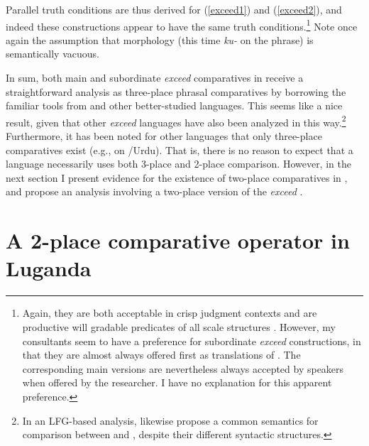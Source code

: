 \documentclass[output=paper,
modfonts
]{langscibook}
\begin{document}
Parallel truth conditions are thus derived for (\ref{exceed1}) and (\ref{exceed2}), and indeed these constructions appear to have the same truth conditions.\footnote{Again, they are both acceptable in crisp judgment contexts and are productive will gradable predicates of all scale structures \citep{bochnak13crosslinguistic}. However, my consultants seem to have a preference for subordinate {\it exceed} constructions, in that they are almost always offered first as translations of . The corresponding main  versions are nevertheless always accepted by speakers when offered by the researcher. I have no explanation for this apparent preference.} Note once again the assumption that  morphology (this time {\it ku-} on the  phrase) is semantically vacuous.


In sum, both main  and subordinate {\it exceed} comparatives in  receive a straightforward analysis as three-place phrasal comparatives by borrowing the familiar tools from  and other better-studied languages. This seems like a nice result, given that other {\it exceed} languages have also been analyzed in this way.\footnote{In an LFG-based analysis, \citet{beerman05comparison} likewise propose a common semantics for comparison between  and , despite their different syntactic structures.} Furthermore, it has been noted for other languages that only three-place comparatives exist (e.g., \citealt{bhatt11reduced} on /Urdu). That is, there is no reason to expect that a language necessarily uses both 3-place and 2-place comparison. However, in the next section I present evidence for the existence of two-place comparatives in , and propose an analysis involving a two-place version of the {\it exceed} .








\section{A 2-place comparative operator in Luganda}\label{sec4}
\end{document}
